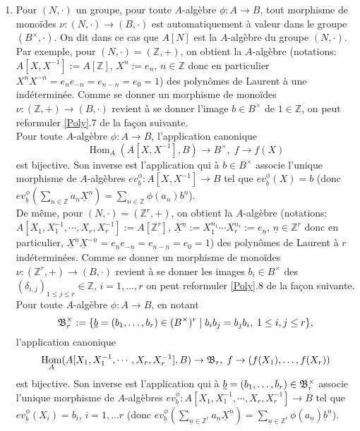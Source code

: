 \documentclass[a4paper, oneside, 12pt]{book}
\theoremstyle{theoremeStyle} %
\theoremstyle{definition} %
\DeclareMathOperator{\SHom}{Hom}
\newcommand{\Z}{\mathbb{Z}}
\begin{document}
\begin{enumerate}[leftmargin=* ,parsep=0cm,itemsep=0cm,topsep=0cm]
 \item Pour $(N,\cdot)$ un groupe, pour toute $A$-algèbre $\phi:A\rightarrow B$, tout morphisme de monoïdes $\nu:(N,\cdot)\rightarrow (B,\cdot)$ est automatiquement à valeur dans le groupe $(B^\times,\cdot)$. On dit dans ce cas que $ A[N]$ est la $A$-algèbre du groupe $(N,\cdot)$.\\

  Par exemple, pour $(N,\cdot)=(\Z,+)$, on obtient la $A$-algèbre (notations:  $A[X,X^{-1}]:=A[\Z]$, $X^n:=e_n$, $n\in \Z$ donc en particulier $X^nX^{-n}=e_ne_{-n}=e_{n-n}=e_0=1$) des polynômes de Laurent à une indéterminée. Comme se donner    un morphisme de monoïdes $\nu:(\Z,+)\rightarrow (B ,\cdot)$ revient à se donner l'image  $b \in B^\times $ de $1\in \Z$, on peut reformuler \ref{Poly}.7 de la fa\c{c}on suivante.\\

   Pour toute $A$-algèbre $\phi:A\rightarrow B$,  l'application canonique
$$\SHom_A(A[X,X^{-1}],B)\rightarrow B^\times,\; f\rightarrow f(X)$$
 est bijective. Son inverse est l'application qui à $b \in B^\times$ associe l'unique morphisme de $A$-algèbres $ev_{\underline{b}}^\phi:A[X,X^{-1}]\rightarrow B$ tel que $ev_{\underline{b}}^\phi(X)=b$ (donc $ev_{\underline{b}}^\phi(\sum_{n\in \Z}a_n\underline{X}^{\underline{n}})=\sum_{n\in \Z}\phi(a_n)b^n$).\\

  De même, pour $(N,\cdot)=(\Z^r,+)$, on obtient la $A$-algèbre (notations:  $A[X_1,X_1^{-1},\cdots, X_r,X_r^{-1}]:=A[\Z^r]$, $\underline{X}^{\underline{n}}:=X_1^{n_1}\cdots X_r^{n_r}:=e_{\underline{n}}$, $\underline{n}\in \Z^r$ donc en particulier, $\underline{X}^{\underline{n}}\underline{X}^{-\underline{n}}= e_{\underline{n}}e_{-\underline{n}}=e_{\underline{n}-\underline{n}}=e_0=1$) des polynômes de Laurent à $r$ indéterminées. Comme se donner    un morphisme de monoïdes $\nu:(\Z^r,+)\rightarrow (B ,\cdot)$ revient à se donner les images $b_i \in B^\times $ des $(\delta_{i,j})_{1\leq j\leq r}\in \Z$, $i=1,\dots, r$ on peut reformuler \ref{Poly}.8 de la fa\c{c}on suivante.\\

   Pour toute $A$-algèbre $\phi:A\rightarrow B$, en notant
 $$\frak{B}^\times_r:= \lbrace \underline{b}=(b_1,\dots, b_r)\in (B^\times)^r\;|\; b_ib_j=b_jb_i,\; 1\leq i,j\leq r\rbrace,$$  l'application canonique
$$\SHom_A(A[X_1,X_1^{-1},\cdots, X_r,X_r^{-1}],B)\rightarrow \frak{B}_r,\; f\rightarrow (f(X_1),\dots, f(X_r))$$
 est bijective. Son inverse est l'application qui à $\underline{b}=(b_1,\dots, b_r)\in \frak{B}^\times_r$ associe l'unique morphisme de $A$-algèbres $ev_{\underline{b}}^\phi:A[X_1,X_1^{-1},\cdots, X_r,X_r^{-1}]\rightarrow B$ tel que $ev_{\underline{b}}^\phi(X_i)=b_i$, $i=1,\dots r$ (donc $ev_{\underline{b}}^\phi(\sum_{\underline{n}\in \Z^r}a_{\underline{n}}\underline{X}^{\underline{n}})=\sum_{\underline{n}\in \Z^r}\phi(a_{\underline{n}})\underline{b}^{\underline{n}}$).\\



 \end{enumerate}
\end{document}
